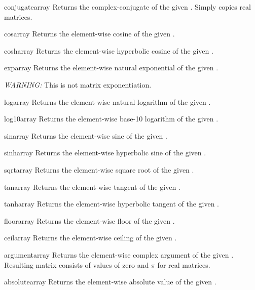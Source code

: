\begin{funcdesc}{conjugate}{array}
  Returns the complex-conjugate of the given . Simply
  copies real matrices.
\end{funcdesc}
\begin{funcdesc}{cos}{array}
  Returns the element-wise cosine of the given .
\end{funcdesc}
\begin{funcdesc}{cosh}{array}
  Returns the element-wise hyperbolic cosine of the given
  .
\end{funcdesc}
\begin{funcdesc}{exp}{array}
  Returns the element-wise natural exponential of the given
  . 

  \emph{WARNING:} This is not matrix exponentiation.
\end{funcdesc}
\begin{funcdesc}{log}{array}
  Returns the element-wise natural logarithm of the given
  .
\end{funcdesc}
\begin{funcdesc}{log10}{array}
  Returns the element-wise base-10 logarithm of the given
  .
\end{funcdesc}
\begin{funcdesc}{sin}{array}
  Returns the element-wise sine of the given .
\end{funcdesc}
\begin{funcdesc}{sinh}{array}
  Returns the element-wise hyperbolic sine of the given .
\end{funcdesc}
\begin{funcdesc}{sqrt}{array}
  Returns the element-wise square root of the given .
\end{funcdesc}
\begin{funcdesc}{tan}{array}
  Returns the element-wise tangent of the given .
\end{funcdesc}
\begin{funcdesc}{tanh}{array}
  Returns the element-wise hyperbolic tangent of the given .
\end{funcdesc}
\begin{funcdesc}{floor}{array}
  Returns the element-wise floor of the given .
\end{funcdesc}
\begin{funcdesc}{ceil}{array}
  Returns the element-wise ceiling of the given .
\end{funcdesc}
\begin{funcdesc}{argument}{array}
  Returns the element-wise complex argument of the given .
  Resulting matrix consists of values of zero and $\pi$ for real matrices.
\end{funcdesc}
\begin{funcdesc}{absolute}{array}
  Returns the element-wise absolute value of the given .
\end{funcdesc}

